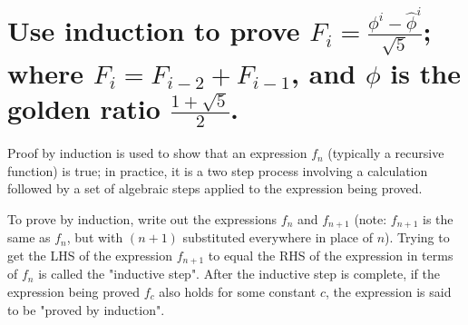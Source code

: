 \section[Problem 2]{Use induction to prove $F_i = \frac{\phi^i - \hat{\phi}^i}{\sqrt{5}}$; where $F_i = F_{i-2} + F_{i-1}$, and $\phi$ is the golden ratio $\frac{1 + \sqrt{5}}{2}$.}

Proof by induction is used to show that an expression $f_n$ (typically a recursive function) is true; in practice, it is a two step process involving a calculation followed by a set of algebraic steps applied to the expression being proved. 

To prove by induction, write out the expressions $f_n$ and $f_{n + 1}$ (note: $f_{n + 1}$ is the same as $f_n$, but with $(n + 1)$ substituted everywhere in place of $n$). Trying to get the LHS of the expression $f_{n + 1}$ to equal the RHS of the expression in terms of $f_n$ is called the "inductive step". After the inductive step is complete, if the expression being proved $f_c$ also holds for some constant $c$, the expression is said to be "proved by induction".

